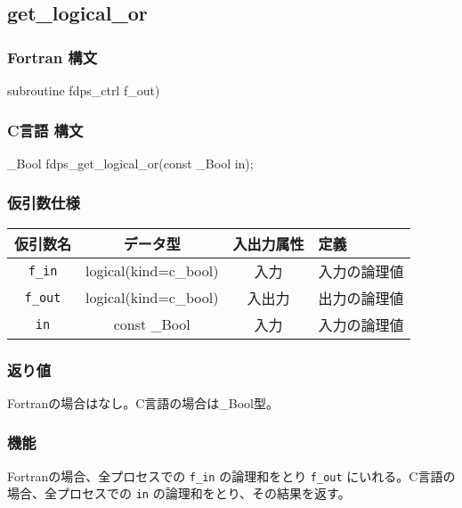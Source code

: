 \subsection{get\_logical\_or}
\subsubsection*{Fortran 構文}
\begin{screen}
\begin{spverbatim}
subroutine fdps_ctrl%
                                     f_out)
\end{spverbatim}
\end{screen}

\subsubsection*{C言語 構文}
\begin{screen}
\begin{spverbatim}
_Bool fdps_get_logical_or(const _Bool in);
\end{spverbatim}
\end{screen}

\subsubsection*{仮引数仕様}
\begin{table}[h]
\begin{tabularx}{\linewidth}{cccX}
\toprule
\rowcolor{Snow2}
仮引数名 & データ型 & 入出力属性 & 定義 \\
\midrule
\verb|f_in| & logical(kind=c\_bool) & 入力 & 入力の論理値\\
\verb|f_out| & logical(kind=c\_bool) & 入出力 & 出力の論理値\\
\verb|in| & const \_Bool & 入力 & 入力の論理値\\
\bottomrule
\end{tabularx}
\end{table}

\subsubsection*{返り値}
Fortranの場合はなし。C言語の場合は\_Bool型。

\subsubsection*{機能}
Fortranの場合、全プロセスでの \texttt{f\_in} の論理和をとり \texttt{f\_out} にいれる。C言語の場合、全プロセスでの \texttt{in} の論理和をとり、その結果を返す。

